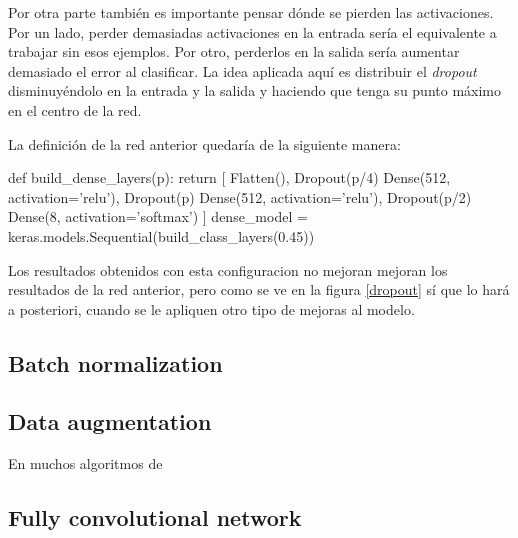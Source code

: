 Por otra parte también es importante pensar dónde se pierden las activaciones. Por un lado, perder demasiadas activaciones en la entrada sería el equivalente a trabajar sin esos ejemplos. Por otro, perderlos en la salida sería aumentar demasiado el error al clasificar. La idea aplicada aquí es distribuir el \textit{dropout} disminuyéndolo en la entrada y la salida y haciendo que tenga su punto máximo en el centro de la red.

La definición de la red anterior quedaría de la siguiente manera:

\begin{python}
def build_dense_layers(p):
    return [
        Flatten(),
        Dropout(p/4)
        Dense(512, activation='relu'),
        Dropout(p)
        Dense(512, activation='relu'),
        Dropout(p/2)
        Dense(8, activation='softmax')
    ]
dense_model = keras.models.Sequential(build_class_layers(0.45))
\end{python}

Los resultados obtenidos con esta configuracion no mejoran mejoran los resultados de la red anterior, pero como se ve en la figura \ref{dropout} sí que lo hará a posteriori, cuando se le apliquen otro tipo de mejoras al modelo.

\subsection{Batch normalization}

\subsection{Data augmentation}

En muchos algoritmos de 
\subsection{Fully convolutional network}

